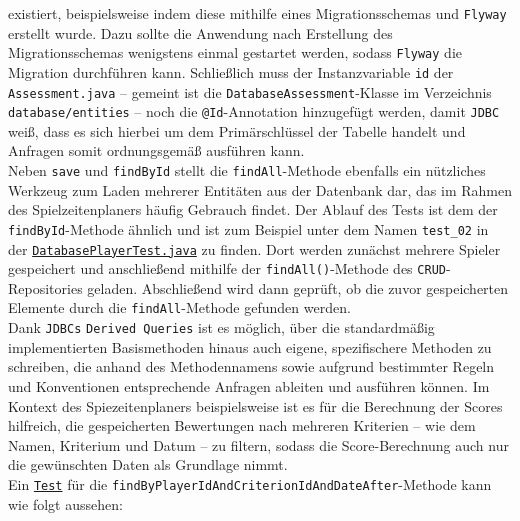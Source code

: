 existiert, beispielsweise indem diese mithilfe eines Migrationsschemas und 
\texttt{Flyway} erstellt wurde. Dazu sollte die Anwendung nach Erstellung des 
Migrationsschemas wenigstens einmal gestartet werden, sodass \texttt{Flyway} die 
Migration durchführen kann. Schließlich muss der Instanzvariable \texttt{id} der 
\texttt{Assessment.java} -- gemeint ist die \texttt{DatabaseAssessment}-Klasse im Verzeichnis \texttt{database/entities} -- noch die \texttt{@Id}-Annotation hinzugefügt 
werden, damit \texttt{JDBC} weiß, dass es sich hierbei um dem Primärschlüssel der 
Tabelle handelt und Anfragen somit ordnungsgemäß ausführen kann. \\ 
Neben \texttt{save} und \texttt{findById} stellt die \texttt{findAll}-Methode 
ebenfalls ein nützliches Werkzeug zum Laden mehrerer Entitäten aus der Datenbank dar, 
das im Rahmen des Spielzeitenplaners häufig Gebrauch findet. Der Ablauf des Tests 
ist dem der \texttt{findById}-Methode ähnlich und ist zum Beispiel unter dem Namen 
\texttt{test\_02} in der
\href{https://github.com/FlorianOhmes/bat_spielzeitenplaner/blob/main/spielzeitenplaner/src/test/java/de/bathesis/spielzeitenplaner/database/DatabasePlayerTest.java}{\texttt{DatabasePlayerTest.java}}
zu finden. Dort werden zunächst mehrere Spieler gespeichert und anschließend 
mithilfe der \texttt{findAll()}-Methode des \texttt{CRUD}-Repositories geladen. 
Abschließend wird dann geprüft, ob die zuvor gespeicherten Elemente durch die 
\texttt{findAll}-Methode gefunden werden. \\ 
Dank \texttt{JDBCs} \texttt{Derived Queries} ist es möglich, über die standardmäßig 
implementierten Basismethoden hinaus auch eigene, spezifischere Methoden zu schreiben, 
die anhand des Methodennamens sowie aufgrund bestimmter Regeln und Konventionen 
entsprechende Anfragen ableiten und ausführen können. Im Kontext des 
Spiezeitenplaners beispielsweise ist es für die Berechnung der Scores hilfreich, 
die gespeicherten Bewertungen nach mehreren Kriterien -- wie dem Namen, Kriterium 
und Datum -- zu filtern, sodass die Score-Berechnung auch nur die gewünschten Daten 
als Grundlage nimmt. \\ 
Ein 
\href{https://github.com/FlorianOhmes/bat_spielzeitenplaner/blob/main/spielzeitenplaner/src/test/java/de/bathesis/spielzeitenplaner/database/DatabaseAssessmentTest.java}{\texttt{Test}} 
für die \texttt{findByPlayerIdAndCriterionIdAndDateAfter}-Methode kann wie 
folgt aussehen: 

